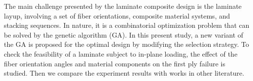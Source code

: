 The main challenge presented by the laminate composite design is the laminate
layup, involving a set of fiber orientations, composite material systems, and
stacking sequences. In nature, it is a combinatorial optimization problem that
can be solved by the genetic algorithm (GA). In this present study, a new
variant of the GA is proposed for the optimal design by modifying the selection
strategy.  To check the feasibility of a laminate subject to in-plane loading,
the effect of the fiber orientation angles and material components on the first
ply failure is studied. Then we compare the experiment results with works in
other literature.
